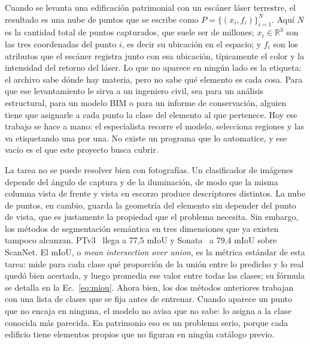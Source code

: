 
\renewcommand{\thetable}{\Alph{table}}

Cuando se levanta una edificación patrimonial con un escáner láser terrestre, el
resultado es una nube de puntos que se escribe como
$P=\{(x_i,f_i)\}_{i=1}^{N}$. Aquí $N$ es la cantidad total de puntos capturados,
que suele ser de millones; $x_i\in\mathbb{R}^3$ son las tres coordenadas del
punto $i$, es decir su ubicación en el espacio; y $f_i$ son los atributos que el
escáner registra junto con esa ubicación, típicamente el color y la intensidad
del retorno del láser. Lo que no aparece en ningún lado es la etiqueta: el
archivo sabe dónde hay materia, pero no sabe qué elemento es cada cosa. Para que
ese levantamiento le sirva a un ingeniero
civil, sea para un análisis estructural, para un modelo BIM o para un informe de
conservación, alguien tiene que asignarle a cada punto la clase del elemento al
que pertenece. Hoy ese trabajo se hace a mano: el especialista recorre el modelo,
selecciona regiones y las va etiquetando una por una. No existe un programa que
lo automatice, y ese vacío es el que este proyecto busca cubrir.

La tarea no se puede resolver bien con fotografías. Un clasificador de imágenes
depende del ángulo de captura y de la iluminación, de modo que la misma columna
vista de frente y vista en escorzo produce descriptores distintos. La nube de
puntos, en cambio, guarda la geometría del elemento sin depender del punto de
vista, que es justamente la propiedad que el problema necesita. Sin embargo, los
métodos de segmentación semántica en tres dimensiones que ya existen tampoco
alcanzan. PTv3~\cite{ptv3} llega a 77,5 mIoU y Sonata~\cite{sonata} a 79,4 mIoU
sobre ScanNet. El mIoU, o \emph{mean intersection over union}, es la métrica
estándar de esta tarea: mide para cada clase qué proporción de la unión entre lo
predicho y lo real quedó bien acertada, y luego promedia ese valor entre todas
las clases; su fórmula se detalla en la Ec.~\eqref{eq:miou}. Ahora bien, los dos
métodos anteriores trabajan con una lista de clases que se fija antes de
entrenar. Cuando aparece un punto que no encaja en ninguna, el modelo no avisa que
no sabe: lo asigna a la clase conocida más parecida. En patrimonio eso es un
problema serio, porque cada edificio tiene elementos propios que no figuran en
ningún catálogo previo.

